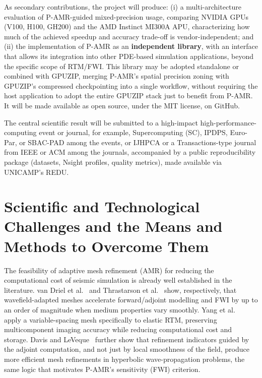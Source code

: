 \documentclass[12pt,a4paper]{article}
\newcommand{\pamr}{P\nobreakdash-AMR}
\begin{document}
As secondary contributions, the project will produce: (i) a
multi-architecture evaluation of P-AMR-guided mixed-precision usage,
comparing NVIDIA GPUs (V100, H100, GH200) and the AMD Instinct MI300A APU,
characterizing how much of the achieved speedup and accuracy trade-off is
vendor-independent; and (ii) the implementation of P-AMR as an
\textbf{independent library}, with an interface that allows its integration
into other PDE-based simulation applications, beyond the specific scope of
RTM/FWI. This library may be adopted standalone or combined with GPUZIP,
merging P-AMR's spatial precision zoning with GPUZIP's compressed
checkpointing into a single workflow, without requiring the host application
to adopt the entire GPUZIP stack just to benefit from P-AMR. It will be made
available as open source, under the MIT license, on GitHub.

The central scientific result will be submitted to a high-impact
high-performance-computing event or journal, for example, Supercomputing
(SC), IPDPS, Euro-Par, or SBAC-PAD among the events, or IJHPCA or a
Transactions-type journal from IEEE or ACM among the journals, accompanied
by a public reproducibility package (datasets, Nsight profiles, quality
metrics), made available via UNICAMP's REDU.

\section{Scientific and Technological Challenges and the Means and Methods
to Overcome Them}

The feasibility of adaptive mesh refinement (AMR) for reducing the
computational cost of seismic simulation is already well established in
the literature. van Driel et al.~\cite{vandriel2020wavefield1} and
Thrastarson et al.~\cite{thrastarson2020wavefield2} show, respectively,
that wavefield-adapted meshes accelerate forward/adjoint modelling and FWI
by up to an order of magnitude when medium properties vary smoothly. Yang
et al.~\cite{yang2024elasticrtm} apply a variable-spacing mesh specifically
to elastic RTM, preserving multicomponent imaging accuracy while reducing
computational cost and storage. Davis and LeVeque~\cite{davis2015adjoint}
further show that refinement indicators guided by the adjoint computation,
and not just by local smoothness of the field, produce more efficient mesh
refinements in hyperbolic wave-propagation problems, the same logic that
motivates \pamr{}'s sensitivity (FWI) criterion.
\end{document}
